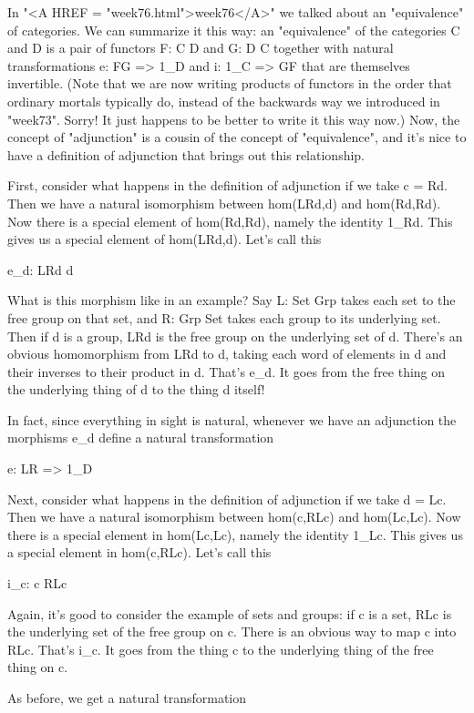 In "<A HREF = "week76.html">week76</A>" we talked about an
"equivalence" of categories.  We can summarize it this way: an
"equivalence" of the categories C and D is a pair of functors
F: C \to  D and G: D \to  C together with natural transformations e:
FG => 1_{D} and i: 1_{C} => GF that are themselves
invertible.  (Note that we are now writing products of functors in the
order that ordinary mortals typically do, instead of the backwards way
we introduced in "week73".  Sorry!  It just happens to be
better to write it this way now.)  Now, the concept of
"adjunction" is a cousin of the concept of
"equivalence", and it's nice to have a definition of
adjunction that brings out this relationship.

First, consider what happens in the definition of adjunction if we take
c = Rd.  Then we have a natural isomorphism between hom(LRd,d) and
hom(Rd,Rd).  Now there is a special element of hom(Rd,Rd), namely the
identity 1_{Rd}.  This gives us a special element of hom(LRd,d).  Let's call
this

e_{d}: LRd \to  d

What is this morphism like in an example?  Say L: Set \to  Grp takes each
set to the free group on that set, and R: Grp \to  Set takes each group to
its underlying set.  Then if d is a group, LRd is the free group on the
underlying set of d.  There's an obvious homomorphism from LRd to d,
taking each word of elements in d and their inverses to their product in
d.  That's e_{d}.  It goes from the free thing on the underlying thing of
d to the thing d itself!

In fact, since everything in sight is natural, whenever we have an
adjunction the morphisms e_{d} define a natural transformation

e: LR => 1_{D}

Next, consider what happens in the definition of adjunction if we take
d = Lc.  Then we have a natural isomorphism between hom(c,RLc) and
hom(Lc,Lc).  Now there is a special element in hom(Lc,Lc), namely the
identity 1_{Lc}.  This gives us a special element in hom(c,RLc).  Let's
call this  

i_{c}: c \to  RLc

Again, it's good to consider the example of sets and groups: if c is a
set, RLc is the underlying set of the free group on c.  There is an
obvious way to map c into RLc.  That's i_{c}.  It goes from the thing c
to the underlying thing of the free thing on c.

As before, we get a natural transformation

